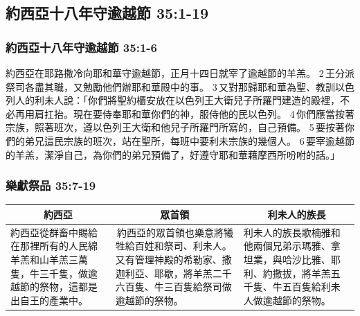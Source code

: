 \subsection{約西亞十八年守逾越節 35:1-19}
\subsubsection{約西亞十八年守逾越節 35:1-6}
約西亞在耶路撒冷向耶和華守逾越節，正月十四日就宰了逾越節的羊羔。 2 王分派祭司各盡其職，又勉勵他們辦耶和華殿中的事。 3 又對那歸耶和華為聖、教訓以色列人的利未人說：「你們將聖約櫃安放在以色列王大衛兒子所羅門建造的殿裡，不必再用肩扛抬。現在要侍奉耶和華你們的神，服侍他的民以色列。 4 你們應當按著宗族，照著班次，遵以色列王大衛和他兒子所羅門所寫的，自己預備。 5 要按著你們的弟兄這民宗族的班次，站在聖所，每班中要利未宗族的幾個人。 6 要宰逾越節的羊羔，潔淨自己，為你們的弟兄預備了，好遵守耶和華藉摩西所吩咐的話。」

\subsubsection{樂獻祭品 35:7-19}
\begin{table}[H]
\centering
\begin{tabular}{p{}|p{6.25cm}|p{5.5cm}}\hline\hline
\multicolumn{1}{c|}{約西亞}&\multicolumn{1}{c|}{眾首領}&\multicolumn{1}{c}{利未人的族長}\\\hline
約西亞從群畜中賜給在那裡所有的人民綿羊羔和山羊羔三萬隻，牛三千隻，做逾越節的祭物，這都是出自王的產業中。
& 約西亞的眾首領也樂意將犧牲給百姓和祭司、利未人。又有管理神殿的希勒家、撒迦利亞、耶歇，將羊羔二千六百隻、牛三百隻給祭司做逾越節的祭物。
&利未人的族長歌楠雅和他兩個兄弟示瑪雅、拿坦業，與哈沙比雅、耶利、約撒拔，將羊羔五千隻、牛五百隻給利未人做逾越節的祭物。\\\hline
\end{tabular}
\end{table} 


